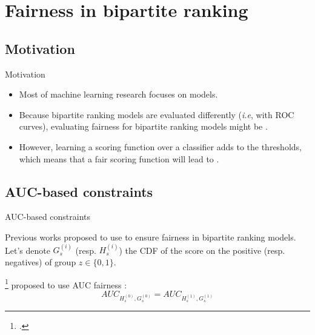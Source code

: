 \section{Fairness in bipartite ranking}

\subsection{Motivation}
\begin{frame}{Motivation}
    \begin{itemize}
        \item Most of  machine learning research focuses on  models.
        \item Because bipartite ranking models are evaluated differently (\textit{i.e}, with ROC curves), evaluating fairness for bipartite ranking models might be .        
        \item However, learning a scoring function over a classifier adds  to the thresholds, which means that a fair scoring function will lead to .
    \end{itemize}
\end{frame}


\subsection{AUC-based constraints}
\begin{frame}{AUC-based constraints}

    
    Previous works proposed to use  to ensure fairness in bipartite ranking models. Let's denote $G_s^{(i)}$ (resp. $H_s^{(i)}$) the CDF of the score on the positive (resp. negatives) of group $z \in \{0,1\}$.
    
    \citeauthor{beutel2019fairness}\footcite{beutel2019fairness} proposed to use  AUC fairness :
    \begin{equation}
        AUC_{H_s^{(0)},G_s^{(0)}} = AUC_{H_s^{(1)},G_s^{(1)}}
    \end{equation}

    

\end{frame}


